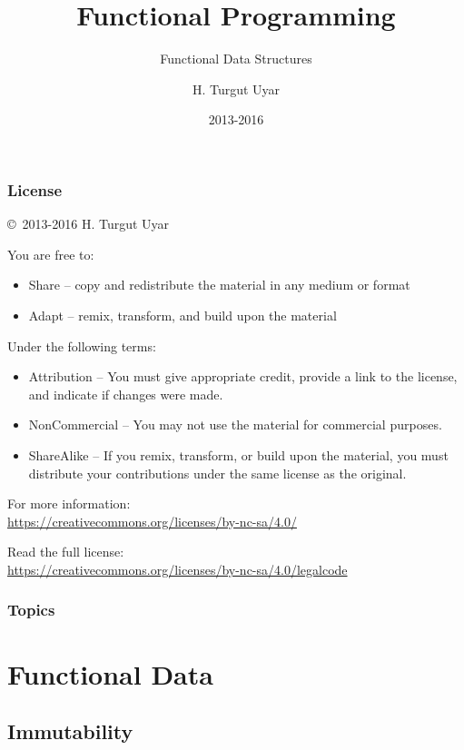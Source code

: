 \documentclass[dvipsnames]{beamer}
\title{Functional Programming}
\subtitle{Functional Data Structures}
\author{H. Turgut Uyar}
\date{2013-2016}
\theoremstyle{plain}
\begin{document}
\begin{frame}
  \titlepage
\end{frame}

\begin{frame}
  \frametitle{License}

  \hfill
  \copyright~2013-2016 H. Turgut Uyar

  \vfill
  \begin{footnotesize}
    You are free to:
    \begin{itemize}
      \itemsep0em
      \item Share -- copy and redistribute the material in any medium or format
      \item Adapt -- remix, transform, and build upon the material
    \end{itemize}

    Under the following terms:
    \begin{itemize}
      \itemsep0em
      \item Attribution -- You must give appropriate credit, provide a link to
        the license, and indicate if changes were made.

      \item NonCommercial -- You may not use the material for commercial
        purposes.

      \item ShareAlike -- If you remix, transform, or build upon the material,
        you must distribute your contributions under the same license as the
        original.
    \end{itemize}

    For more information:\\
    \url{https://creativecommons.org/licenses/by-nc-sa/4.0/}

    \smallskip
    Read the full license:\\
    \url{https://creativecommons.org/licenses/by-nc-sa/4.0/legalcode}
  \end{footnotesize}
\end{frame}

\begin{frame}
  \frametitle{Topics}
  \tableofcontents
\end{frame}

\section{Functional Data}

\subsection{Immutability}
\end{document}

